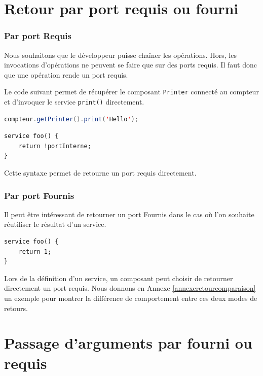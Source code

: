 \documentclass[11pt,a4paper,openany,oneside]{book}
\begin{document}
\section{Retour par port requis ou fourni}

\subsubsection{Par port Requis}
Nous souhaitons que le développeur puisse chaîner les opérations. Hors, les invocations d'opérations ne peuvent se faire que sur des ports requis. Il faut donc que une opération rende un port requis.

Le code suivant permet de récupérer le composant \texttt{Printer} connecté au compteur et d'invoquer le service \texttt{print()} directement.
\begin{lstlisting}[language=JAVA, frame=single, caption=Syntaxe d'un chaînage d'incocation en COMPO]
compteur.getPrinter().print('Hello');
\end{lstlisting}



\begin{lstlisting}[language=COMPO, frame=single, caption=Syntaxe de retour d'un port requis en COMPO]
service foo() {
    return !portInterne;
}
\end{lstlisting}

Cette syntaxe permet de retourne un port requis directement.


\subsubsection{Par port Fournis}
Il peut être intéressant de retourner un port Fournis dans le cas où l'on souhaite réutiliser le résultat d'un service.


\begin{lstlisting}[language=COMPO, frame=single, caption=Syntaxe de retour d'un port founis en COMPO]
service foo() {
    return 1;
}
\end{lstlisting}

Lors de la définition d'un service, un composant peut choisir de retourner directement un port requis.
Nous donnons en Annexe \ref{annexeretourcomparaison} un exemple pour montrer la différence de comportement entre ces deux modes de retours.


\section{Passage d'arguments par fourni ou requis}
\end{document}
